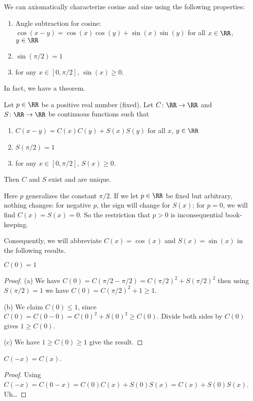 We can axiomatically characterize cosine and sine using the following
properties:
\begin{enumerate}
\item Angle subtraction for cosine: $\cos(x-y) = \cos(x)\cos(y) + \sin(x)\sin(y)$ for all $x\in\RR$, $y\in\RR$
\item $\sin(\pi/2)=1$
\item for any $x\in[0,\pi/2]$, $\sin(x)\geq0$.
\end{enumerate}
In fact, we have a theorem.

\begin{theorem}
Let $p\in\RR$ be a positive real number (fixed). Let $C\colon\RR\to\RR$
and $S\colon\RR\to\RR$ be continuous functions such that
\begin{enumerate}
\item $C(x-y) = C(x)C(y) + S(x)S(y)$ for all $x$, $y\in\RR$
\item $S(\pi/2)=1$
\item for any $x\in[0,\pi/2]$, $S(x)\geq0$.
\end{enumerate}
Then $C$ and $S$ exist and are unique.
\end{theorem}

Here $p$ generalizes the constant $\pi/2$. If we let $p\in\RR$ be fixed
but arbitrary, nothing changes: for negative $p$, the sign will change
for $S(x)$; for $p=0$, we will find $C(x)=S(x)=0$. So the restriction
that $p>0$ is inconsequential book-keeping.

Consequently, we will abbreviate $C(x)=\cos(x)$ and $S(x)=\sin(x)$ in
the following results.

\begin{proposition}
$C(0) = 1$
\end{proposition}
\begin{proof}
(a) We have $C(0) = C(\pi/2 - \pi/2) = C(\pi/2)^{2} + S(\pi/2)^{2}$
then using $S(\pi/2)=1$ we have $C(0) = C(\pi/2)^{2} + 1\geq 1$.

(b) We claim $C(0)\leq 1$, since $C(0) = C(0 - 0) = C(0)^{2} + S(0)^{2}\geq C(0)$.
Divide both sides by $C(0)$ gives $1\geq C(0)$.

(c) We have $1\geq C(0)\geq 1$ give the result.
\end{proof}

\begin{proposition}
$C(-x) = C(x)$.
\end{proposition}
\begin{proof}
Using $C(-x) = C(0 - x) = C(0)C(x) + S(0)S(x) = C(x) + S(0)S(x)$.
Uh\dots
\end{proof}

